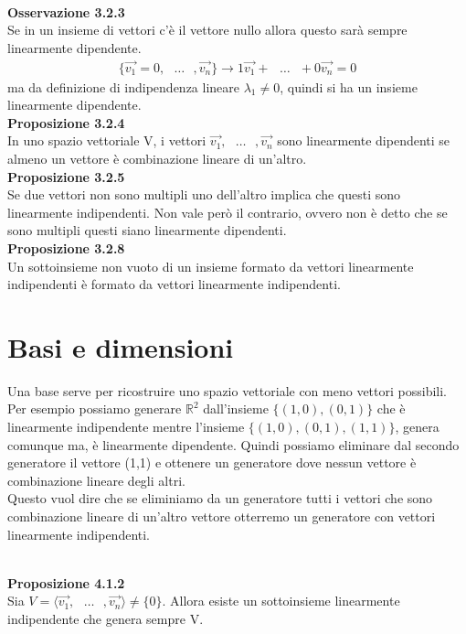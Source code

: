 \documentclass{article}
\begin{document}
\vspace{5px}
\textbf{\\Osservazione 3.2.3}
\\ Se in un insieme di vettori c'è il vettore nullo allora questo sarà sempre linearmente dipendente.
\begin{align*}
  \{\vec{v_1}=0,\text{ }\dots\text{ },\vec{v_n}\} \to 1\vec{v_1}+\text{ }\dots\text{ }+0\vec{v_n}=0
\end{align*}
ma da definizione di indipendenza lineare $\lambda_1\neq0$, quindi si ha un insieme linearmente dipendente.
\vspace{5px}
\textbf{\\Proposizione 3.2.4}
\\ In uno spazio vettoriale V, i vettori $\vec{v_1},\text{ }\dots\text{ },\vec{v_n}$ sono linearmente dipendenti se almeno un vettore è combinazione lineare di un'altro.
\vspace{5px}
\textbf{\\Proposizione 3.2.5}
\\ Se due vettori non sono multipli uno dell'altro implica che questi sono linearmente indipendenti. Non vale però il contrario, ovvero non è detto che se sono multipli questi siano linearmente dipendenti.
\vspace{5px}
\textbf{\\Proposizione 3.2.8}
\\ Un sottoinsieme non vuoto di un insieme formato da vettori linearmente indipendenti è formato da vettori linearmente indipendenti.

\pagebreak
\section{Basi e dimensioni}
Una base serve per ricostruire uno spazio vettoriale con meno vettori possibili.
\\Per esempio possiamo generare $\mathbb{R}^2$ dall'insieme $\{(1,0),(0,1)\}$ che è linearmente indipendente mentre l'insieme $\{(1,0),(0,1),(1,1)\}$, genera comunque ma, è linearmente dipendente.
Quindi possiamo eliminare dal secondo generatore il vettore (1,1) e ottenere un generatore dove nessun vettore è combinazione lineare degli altri.
\\ Questo vuol dire che se eliminiamo da un generatore tutti i vettori che sono combinazione lineare di un'altro vettore otterremo un generatore con vettori linearmente indipendenti.

\vspace{5px}
\textbf{\\Proposizione 4.1.2}
\\Sia $V=\langle\vec{v_1},\text{ }\dots\text{ },\vec{v_n}\rangle \neq \{0\}$. Allora esiste un sottoinsieme linearmente indipendente che genera sempre V.
\end{document}
